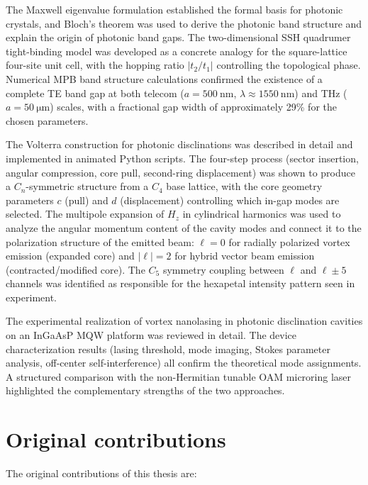 \documentclass[12pt,a4paper,oneside]{book}
\theoremstyle{plain}
\theoremstyle{definition}
\theoremstyle{remark}
\begin{document}
The Maxwell eigenvalue formulation established the formal basis for photonic crystals, and Bloch's theorem was used to derive the photonic band structure and explain the origin of photonic band gaps. The two-dimensional SSH quadrumer tight-binding model was developed as a concrete analogy for the square-lattice four-site unit cell, with the hopping ratio $|t_2/t_1|$ controlling the topological phase. Numerical MPB band structure calculations confirmed the existence of a complete TE band gap at both telecom ($a = \SI{500}{\nano\metre}$, $\lambda \approx \SI{1550}{\nano\metre}$) and THz ($a = \SI{50}{\micro\metre}$) scales, with a fractional gap width of approximately 29\% for the chosen parameters.

The Volterra construction for photonic disclinations was described in detail and implemented in animated Python scripts. The four-step process (sector insertion, angular compression, core pull, second-ring displacement) was shown to produce a $C_n$-symmetric structure from a $C_4$ base lattice, with the core geometry parameters $c$ (pull) and $d$ (displacement) controlling which in-gap modes are selected. The multipole expansion of $H_z$ in cylindrical harmonics was used to analyze the angular momentum content of the cavity modes and connect it to the polarization structure of the emitted beam: $\ell = 0$ for radially polarized vortex emission (expanded core) and $|\ell| = 2$ for hybrid vector beam emission (contracted/modified core). The $C_5$ symmetry coupling between $\ell$ and $\ell\pm 5$ channels was identified as responsible for the hexapetal intensity pattern seen in experiment.

The experimental realization of vortex nanolasing in photonic disclination cavities on an InGaAsP MQW platform was reviewed in detail. The device characterization results (lasing threshold, mode imaging, Stokes parameter analysis, off-center self-interference) all confirm the theoretical mode assignments. A structured comparison with the non-Hermitian tunable OAM microring laser highlighted the complementary strengths of the two approaches.

\section{Original contributions}
\label{sec:contributions}

The original contributions of this thesis are:
\end{document}

